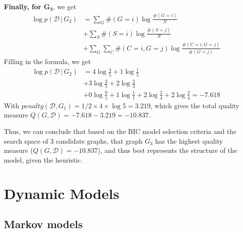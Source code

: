 \documentclass{article}
\newcommand{\giv}{\,|\,}
\begin{document}
\\
\textbf{Finally, for $\mathbf{G_3}$}, we get
\begin{align*}
    \log p(\mathcal{D} \giv G_2) &= \sum_G \#(G = i) \log \frac{\#(G = i)}{N} \\
    &+ \sum_S \#(S = i) \log \frac{\#(S = j)}{N}\\
    &+ \sum_G\sum_C \#(C = i, G = j) \log \frac{\#(C = i, G = j)}{\#(G = j)}
\end{align*}
\noindent Filling in the formula, we get
\begin{align*}
    \log p(\mathcal{D} \giv G_2) &= 4 \log \frac{4}{5} + 1 \log \frac{1}{5} \\
    &+ 3 \log \frac{3}{5} + 2 \log \frac23\\
    &+ 0 \log \frac01 + 1 \log \frac11 + 2 \log \frac24 + 2 \log \frac24 = -7.618
\end{align*}
\noindent With $penalty(\mathcal{D}, G_1) = 1/2 \times 4 \times \log 5 = 3.219$, which gives the total quality measure $Q(G, \mathcal{D}) = -7.618 - 3.219 = -10.837$.

Thus, we can conclude that based on the BIC model selection criteria and the search space of 3 candidate graphs, that graph $G_3$ has the highest quality measure ($Q(G, \mathcal{D}) = -10.837$), and thus best represents the structure of the model, given the heuristic. 

\newpage
\section{Dynamic Models}

\subsection{Markov models}
\end{document}
